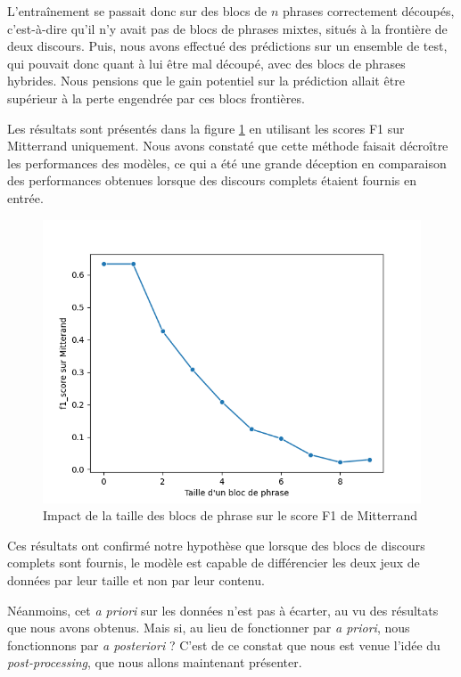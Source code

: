 \documentclass{article}
\begin{document}
L'entraînement se passait donc sur des blocs de $n$ phrases correctement découpés, c'est-à-dire qu'il n'y avait pas de blocs de phrases mixtes, situés à la frontière de deux discours. Puis, nous avons effectué des prédictions sur un ensemble de test, qui pouvait donc quant à lui être mal découpé, avec des blocs de phrases hybrides. Nous pensions que le gain potentiel sur la prédiction allait être supérieur à la perte engendrée par ces blocs frontières.

Les résultats sont présentés dans la figure \ref{fig_n-sentence-perf} en utilisant les scores F1 sur Mitterrand uniquement. Nous avons constaté que cette méthode faisait décroître les performances des modèles, ce qui a été une grande déception en comparaison des performances obtenues lorsque des discours complets étaient fournis en entrée.

\begin{figure}[H]
    \centering
    \includegraphics[width=.75\textwidth]{src/locuteur/n-sentence_bloc_perf.png}
    \caption{Impact de la taille des blocs de phrase sur le score F1 de Mitterrand}
    \label{fig_n-sentence-perf}
\end{figure}

Ces résultats ont confirmé notre hypothèse que lorsque des blocs de discours complets sont fournis, le modèle est capable de différencier les deux jeux de données par leur taille et non par leur contenu.

Néanmoins, cet \textit{a priori} sur les données n'est pas à écarter, au vu des résultats que nous avons obtenus. Mais si, au lieu de fonctionner par \textit{a priori}, nous fonctionnons par \textit{a posteriori} ? C'est de ce constat que nous est venue l'idée du \textit{post-processing}, que nous allons maintenant présenter.
\end{document}

